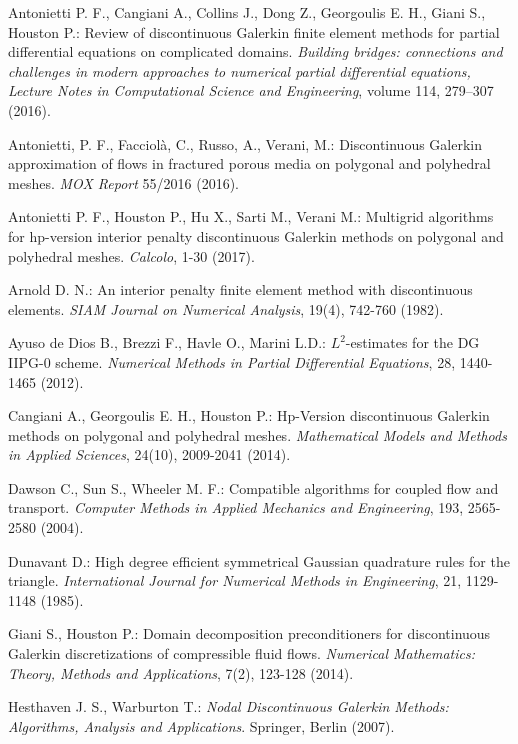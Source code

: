 \documentclass[12pt, a4paper]{article}
\theoremstyle{definition}
\theoremstyle{plain}
\theoremstyle{plain}
\theoremstyle{definition}
\begin{document}
\begin{thebibliography}{99}
	Antonietti P. F., Cangiani  A., Collins J., Dong Z., Georgoulis E. H., Giani S., Houston P.: Review of discontinuous Galerkin finite element methods for partial differential equations on complicated domains. \emph{Building bridges: connections and challenges in modern approaches to numerical partial differential equations, Lecture Notes in Computational Science and Engineering}, volume 114, 279–307 (2016).
	
	Antonietti, P. F., Facciolà, C., Russo, A., Verani, M.: Discontinuous Galerkin approximation of flows in fractured porous media on polygonal and polyhedral meshes. \emph{MOX Report} 55/2016 (2016).
	
	Antonietti P. F., Houston  P., Hu  X., Sarti  M., Verani M.: Multigrid 
	algorithms for hp-version interior penalty discontinuous Galerkin methods 
	on polygonal and polyhedral meshes. \emph{Calcolo}, 1-30 (2017).
	
	Arnold D. N.: An interior penalty finite element method with discontinuous 
	elements. \emph{SIAM Journal on Numerical Analysis}, 19(4), 742-760 (1982).
	
	Ayuso de Dios B., Brezzi F., Havle O., Marini L.D.: $L^2$-estimates for the 
	DG IIPG-0 scheme. \emph{Numerical Methods in Partial Differential 
	Equations}, 28, 1440-1465 (2012).
	
	Cangiani A., Georgoulis E. H., Houston P.: Hp-Version discontinuous 
	Galerkin methods on polygonal and polyhedral meshes. \emph{Mathematical 
	Models and Methods in Applied Sciences}, 24(10), 2009-2041 (2014).
	
	Dawson C., Sun S., Wheeler M. F.: Compatible algorithms for coupled flow 
	and transport. \emph{Computer Methods in Applied Mechanics and 
	Engineering}, 193, 2565-2580 (2004).
	
	Dunavant D.: High degree efficient symmetrical Gaussian quadrature rules 
	for the triangle. \emph{International Journal for Numerical Methods in 
	Engineering}, 21, 1129-1148 (1985).
	
	Giani S., Houston P.: Domain decomposition preconditioners for 
	discontinuous Galerkin discretizations of compressible fluid flows. 
	\emph{Numerical Mathematics: Theory, Methods and Applications}, 7(2), 
	123-128 (2014).
	
	Hesthaven J. S., Warburton T.: \emph{Nodal Discontinuous Galerkin Methods: 
	Algorithms, Analysis and Applications}. Springer, Berlin (2007).
	

\end{thebibliography}
\end{document}
